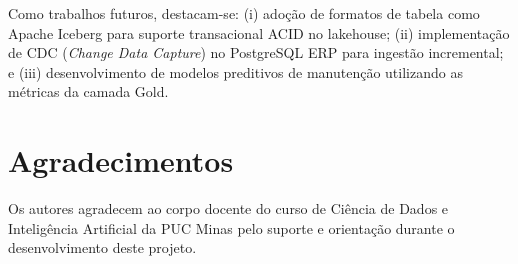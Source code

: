 Como trabalhos futuros, destacam-se: (i) adoção de formatos de tabela como Apache Iceberg
para suporte transacional ACID no lakehouse; (ii) implementação de CDC (\textit{Change
Data Capture}) no PostgreSQL ERP para ingestão incremental; e (iii) desenvolvimento de
modelos preditivos de manutenção utilizando as métricas da camada Gold.

\section*{Agradecimentos}

Os autores agradecem ao corpo docente do curso de Ciência de Dados e Inteligência
Artificial da PUC Minas pelo suporte e orientação durante o desenvolvimento deste
projeto.
